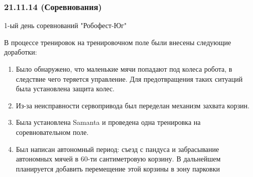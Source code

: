 \subsubsection{21.11.14 (Соревнования)}

\begin{center}
	1-ый день соревнований "Робофест-Юг"
\end{center}
В процессе тренировок на тренировочном поле были внесены следующие доработки:
\begin{enumerate}
	\item Было обнаружено, что  маленькие мячи попадают под колеса робота, в следствие чего теряется управление. Для предотвращения таких ситуаций была установлена защита колес.
	\item Из-за неисправности сервопривода был переделан механизм захвата корзин.
	\item Была установлена Samanta и проведена одна тренировка на соревновательном поле.
	\item Был написан автономный период: съезд с пандуса и забрасывание автономных мячей в 60-ти сантиметровую корзину. В дальнейшем планируется добавить перемещение этой корзины в зону парковки
\end{enumerate}
\fillpage
